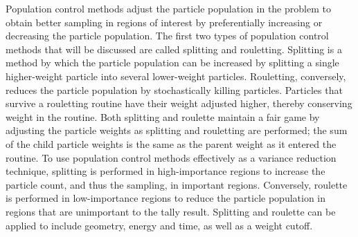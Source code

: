 Population control methods adjust the particle population in the problem to
obtain better sampling in regions of interest by preferentially increasing or
decreasing the particle population.
The first two types of population control methods that will be discussed
are called splitting and rouletting.
Splitting is a method by which the particle population can be increased by
splitting a single higher-weight particle into several lower-weight particles.
Rouletting, conversely, reduces the particle population by stochastically
killing particles. Particles that survive a rouletting routine have their weight
adjusted higher, thereby conserving weight in the routine.
Both splitting and roulette maintain a
fair game by adjusting the particle weights as splitting and rouletting are
performed; the sum of the child particle weights is the same as the parent
weight as it entered the routine.
To use population control methods effectively as a variance reduction technique,
splitting is performed in high-importance regions to increase the particle
count, and thus the sampling, in important regions. Conversely, roulette is
performed in
 low-importance
  regions to reduce the particle population in regions that are unimportant to
  the tally result.
Splitting and roulette can be applied to include geometry, energy and time,
  as well as a weight cutoff.

